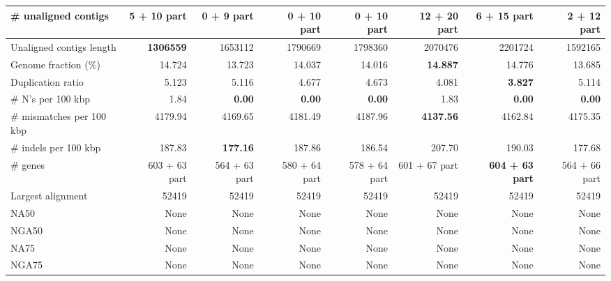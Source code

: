 \documentclass[12pt,a4paper]{article}
\begin{document}
\begin{table}[ht]
\begin{center}
\begin{tabular}{|l*{7}{|r}|}
\# unaligned contigs & 5 + 10 part & {\bf 0 + 9 part} & 0 + 10 part & 0 + 10 part & 12 + 20 part & 6 + 15 part & 2 + 12 part \\ \hline
Unaligned contigs length & {\bf 1306559} & 1653112 & 1790669 & 1798360 & 2070476 & 2201724 & 1592165 \\ \hline
Genome fraction (\%) & 14.724 & 13.723 & 14.037 & 14.016 & {\bf 14.887} & 14.776 & 13.685 \\ \hline
Duplication ratio & 5.123 & 5.116 & 4.677 & 4.673 & 4.081 & {\bf 3.827} & 5.114 \\ \hline
\# N's per 100 kbp & 1.84 & {\bf 0.00} & {\bf 0.00} & {\bf 0.00} & 1.83 & {\bf 0.00} & {\bf 0.00} \\ \hline
\# mismatches per 100 kbp & 4179.94 & 4169.65 & 4181.49 & 4187.96 & {\bf 4137.56} & 4162.84 & 4175.35 \\ \hline
\# indels per 100 kbp & 187.83 & {\bf 177.16} & 187.86 & 186.54 & 207.70 & 190.03 & 177.68 \\ \hline
\# genes & 603 + 63 part & 564 + 63 part & 580 + 64 part & 578 + 64 part & 601 + 67 part & {\bf 604 + 63 part} & 564 + 66 part \\ \hline
Largest alignment & 52419 & 52419 & 52419 & 52419 & 52419 & 52419 & 52419 \\ \hline
NA50 & None & None & None & None & None & None & None \\ \hline
NGA50 & None & None & None & None & None & None & None \\ \hline
NA75 & None & None & None & None & None & None & None \\ \hline
NGA75 & None & None & None & None & None & None & None \\ \hline
\end{tabular}
\end{center}
\end{table}
\end{document}
